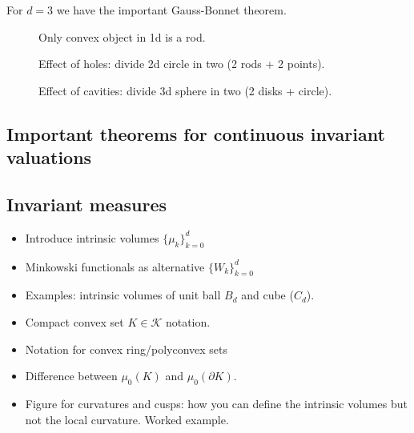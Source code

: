 For $d=3$ we have the important Gauss-Bonnet theorem.

\begin{SCfigure}[H]
  \caption{Only convex object in 1d is a rod.}
\end{SCfigure}

\begin{SCfigure}[H]
  \caption{Effect of holes: divide 2d circle in two (2 rods + 2 points).}
\end{SCfigure}

\begin{SCfigure}[H]
  \caption{Effect of cavities: divide 3d sphere in two (2 disks + circle).}
\end{SCfigure}

\subsection{Important theorems for continuous invariant valuations}

\subsection{Invariant measures}

\begin{itemize}
\item Introduce intrinsic volumes $\{\mu_k\}_{k=0}^d$
\item Minkowski functionals as alternative $\{W_k\}_{k=0}^d$
\item Examples: intrinsic volumes of unit ball $B_d$ and cube ($C_d$).
\item Compact convex set $K \in \mathcal{K}$ notation.
\item Notation for convex ring/polyconvex sets
\item Difference between $\mu_0(K)$ and $\mu_0(\partial K)$.
\item Figure for curvatures and cusps: how you can define the intrinsic volumes but not the local curvature. Worked example.
\end{itemize}

